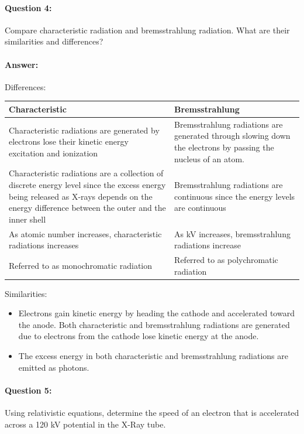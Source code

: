 \documentclass[12pt, letter]{article}
\begin{document}
\paragraph{Question 4:} Compare characteristic radiation and bremsstrahlung radiation. What are their similarities and differences?


\paragraph{Answer: } 
Differences: 
\begin{center}
    \begin{tabular}{ |p{8cm} | p{8cm} |}
    \hline
    Characteristic & Bremsstrahlung \\ \hline
    Characteristic radiations are generated by electrons lose their kinetic energy excitation and ionization & Bremsstrahlung radiations are generated through slowing down the electrons by passing the nucleus of an atom. \\ \hline
    Characteristic radiations are a collection of discrete energy level since the excess energy being released as X-rays depends on the energy difference between the outer and the inner shell & Bremsstrahlung radiations are continuous since the energy levels are continuous \\ \hline
    As atomic number increases, characteristic radiations increases & As kV increases, bremsstrahlung radiations increase \\ \hline
    Referred to as monochromatic radiation & Referred to as polychromatic radiation \\ \hline
    \end{tabular}
\end{center}

Similarities:
\begin{itemize}
    \item Electrons gain kinetic energy by heading the cathode and accelerated toward the anode. Both characteristic and bremsstrahlung radiations are generated due to electrons from the cathode lose kinetic energy at the anode. 
    \item The excess energy in both characteristic and bremsstrahlung radiations are emitted as photons.
\end{itemize}

\paragraph{Question 5: } Using relativistic equations, determine the speed of an electron that is accelerated across a 120 kV potential in the X-Ray tube.
\end{document}
